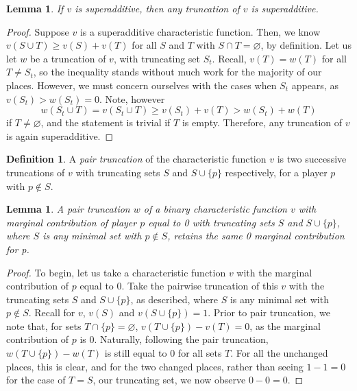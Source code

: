 \documentclass[12pt,letterpaper,final]{article}
\theoremstyle{plain}
\theoremstyle{plain}
\theoremstyle{plain}
\newtheorem{lemma}[theorem]{Lemma}
\theoremstyle{plain}
\theoremstyle{plain}
\theoremstyle{plain}
\theoremstyle{plain}
\theoremstyle{definition}
\newtheorem{definition}{Definition}[section]
\theoremstyle{definition}
\theoremstyle{definition}
\theoremstyle{definition}
\theoremstyle{definition}
\theoremstyle{remark}
\theoremstyle{remark}
\theoremstyle{remark}
\theoremstyle{remark}
\begin{document}
\begin{lemma}
  If \(v\) is superadditive, then any truncation of \(v\) is superadditive.
\end{lemma}

\begin{proof}
  Suppose \(v\) is a superadditive characteristic function. Then, we know
  \(v(S\cup T) \geq v(S) +v(T)\) for all \(S\) and \(T\) with
  \(S\cap T = \varnothing\), by definition. Let us let \(w\) be a
  truncation of \(v\), with truncating set \(S_t\). Recall,
  \(v(T) = w(T)\) for all \(T\neq S_t\), so the inequality
  stands without much work for the majority of our places. However, we
  must concern ourselves with the cases when \(S_t\) appears, as
  \(v(S_t) > w(S_t) = 0\). Note, however
  \[
    w(S_t\cup T) = v(S_t\cup T) \geq v(S_t) +v(T) > w(S_t) +w(T)
  \]
  if \(T\neq \varnothing\), and the statement is trivial if \(T\)
  is empty. Therefore, any truncation of \(v\) is again superadditive.
\end{proof}

      

\begin{definition}
  A \emph{pair truncation} of the characteristic function \(v\) is two successive
  truncations of \(v\) with truncating sets \(S\) and \(S\cup\{p\}\)
  respectively, for a player \(p\) with \(p\notin S\).
\end{definition}

\begin{lemma}\label{lem:truncFunc}
  A pair truncation \(w\) of a binary characteristic function \(v\) with marginal
  contribution of player \(p\) equal to 0 with truncating sets \(S\)
  and \(S\cup\{p\}\), where \(S\) is any minimal set with
  \(p\notin S\), retains the same 0 marginal contribution for p.
\end{lemma}

\begin{proof}
  To begin, let us take a characteristic function \(v\) with the marginal
  contribution of \(p\) equal to 0. Take the pairwise truncation of
  this \(v\) with the truncating sets \(S\) and \(S\cup\{p\}\), as
  described, where \(S\) is any minimal set with \(p\notin S\).
  Recall for \(v\), \(v(S)\) and \(v(S\cup \{p\})=1\).  Prior to pair
  truncation, we note that, for sets \(T \cap \{p\} =\varnothing\),
  \(v(T \cup \{p\}) - v(T) = 0\), as the marginal contribution of
  \(p\) is 0.  Naturally, following the pair truncation,
  \(w(T \cup \{p\}) - w(T)\) is still equal to \(0\) for all sets
  \(T\).  For all the unchanged places, this is clear, and for the two
  changed places, rather than seeing \(1-1=0\) for the case of
  \(T = S\), our truncating set, we now observe \(0-0=0\).
\end{proof}
\end{document}
